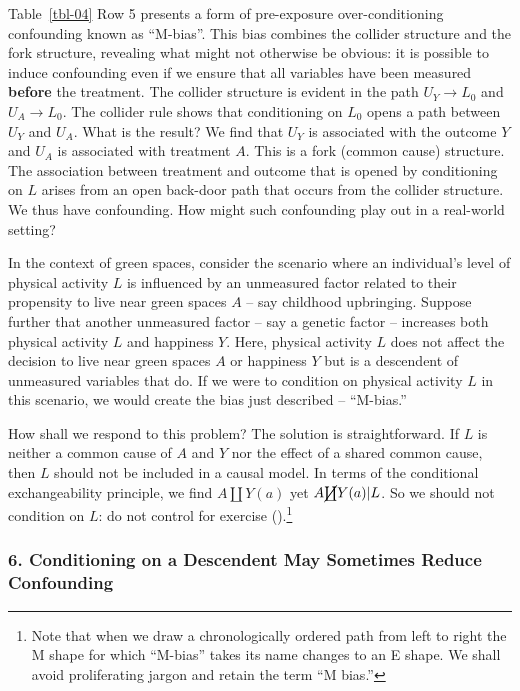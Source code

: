 \documentclass[
  singlecolumn]{article}
\begin{document}
Table~\ref{tbl-04} Row 5 presents a form of pre-exposure
over-conditioning confounding known as ``M-bias''. This bias combines
the collider structure and the fork structure, revealing what might not
otherwise be obvious: it is possible to induce confounding even if we
ensure that all variables have been measured \textbf{before} the
treatment. The collider structure is evident in the path \(U_Y \to L_0\)
and \(U_A \to L_0\). The collider rule shows that conditioning on
\(L_0\) opens a path between \(U_Y\) and \(U_A\). What is the result? We
find that \(U_Y\) is associated with the outcome \(Y\) and \(U_A\) is
associated with treatment \(A\). This is a fork (common cause)
structure. The association between treatment and outcome that is opened
by conditioning on \(L\) arises from an open back-door path that occurs
from the collider structure. We thus have confounding. How might such
confounding play out in a real-world setting?

In the context of green spaces, consider the scenario where an
individual's level of physical activity \(L\) is influenced by an
unmeasured factor related to their propensity to live near green spaces
\(A\) -- say childhood upbringing. Suppose further that another
unmeasured factor -- say a genetic factor -- increases both physical
activity \(L\) and happiness \(Y\). Here, physical activity \(L\) does
not affect the decision to live near green spaces \(A\) or happiness
\(Y\) but is a descendent of unmeasured variables that do. If we were to
condition on physical activity \(L\) in this scenario, we would create
the bias just described -- ``M-bias.''

How shall we respond to this problem? The solution is straightforward.
If \(L\) is neither a common cause of \(A\) and \(Y\) nor the effect of
a shared common cause, then \(L\) should not be included in a causal
model. In terms of the conditional exchangeability principle, we find
\(A \coprod Y(a)\) yet \(A \cancel{\coprod} Y(a)| L\). So we should not
condition on \(L\): do not control for exercise
().\footnote{Note that
  when we draw a chronologically ordered path from left to right the M
  shape for which ``M-bias'' takes its name changes to an E shape. We
  shall avoid proliferating jargon and retain the term ``M bias.''}

\subsubsection{6. Conditioning on a Descendent May Sometimes Reduce
Confounding}\label{conditioning-on-a-descendent-may-sometimes-reduce-confounding}
\end{document}
